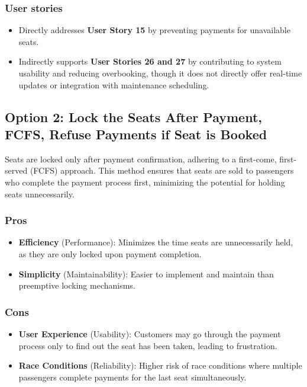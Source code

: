 \subsubsection*{User stories}
\begin{itemize}
    \item Directly addresses \textbf{User Story 15} by preventing payments for unavailable seats.
    \item Indirectly supports \textbf{User Stories 26 and 27} by contributing to system usability and reducing overbooking, though it does not directly offer real-time updates or integration with maintenance scheduling.
\end{itemize}

\subsection*{Option 2: Lock the Seats After Payment, FCFS, Refuse Payments if Seat is Booked}
Seats are locked only after payment confirmation, adhering to a first-come, first-served (FCFS) approach. This method ensures that seats are sold to passengers who complete the payment process first, minimizing the potential for holding seats unnecessarily.

\subsubsection*{Pros}
\begin{itemize}[noitemsep]
    \item \textbf{Efficiency} (Performance): Minimizes the time seats are unnecessarily held, as they are only locked upon payment completion.
    \item \textbf{Simplicity} (Maintainability): Easier to implement and maintain than preemptive locking mechanisms.
\end{itemize}
\subsubsection*{Cons}
\begin{itemize}[noitemsep]
    \item \textbf{User Experience} (Usability): Customers may go through the payment process only to find out the seat has been taken, leading to frustration.
    \item \textbf{Race Conditions} (Reliability): Higher risk of race conditions where multiple passengers complete payments for the last seat simultaneously.
\end{itemize}

